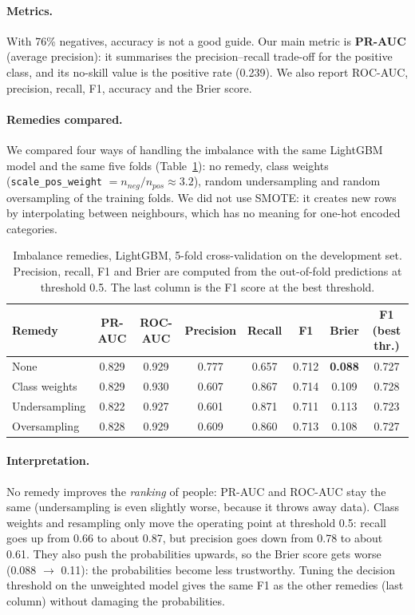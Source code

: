 \documentclass[11pt,a4paper]{article}
\begin{document}
\paragraph{Metrics.}
With 76\% negatives, accuracy is not a good guide. Our main metric is \textbf{PR-AUC} (average precision): it summarises the precision--recall trade-off for the positive class, and its no-skill value is the positive rate (0.239). We also report ROC-AUC, precision, recall, F1, accuracy and the Brier score.

\paragraph{Remedies compared.}
We compared four ways of handling the imbalance with the same LightGBM model and the same five folds (Table~\ref{tab:remedies}): no remedy, class weights (\texttt{scale\_pos\_weight} $= n_{neg}/n_{pos} \approx 3.2$), random undersampling and random oversampling of the training folds.
We did not use SMOTE: it creates new rows by interpolating between neighbours, which has no meaning for one-hot encoded categories.

\begin{table}[!htbp]
\centering
\small
\caption{Imbalance remedies, LightGBM, 5-fold cross-validation on the development set. Precision, recall, F1 and Brier are computed from the out-of-fold predictions at threshold 0.5. The last column is the F1 score at the best threshold.}
\label{tab:remedies}
\begin{tabular}{lccccccc}
\toprule
\textbf{Remedy} & \textbf{PR-AUC} & \textbf{ROC-AUC} & \textbf{Precision} & \textbf{Recall} & \textbf{F1} & \textbf{Brier} & \textbf{F1 (best thr.)} \\
\midrule
None & 0.829 & 0.929 & 0.777 & 0.657 & 0.712 & \textbf{0.088} & 0.727 \\
Class weights & 0.829 & 0.930 & 0.607 & 0.867 & 0.714 & 0.109 & 0.728 \\
Undersampling & 0.822 & 0.927 & 0.601 & 0.871 & 0.711 & 0.113 & 0.723 \\
Oversampling & 0.828 & 0.929 & 0.609 & 0.860 & 0.713 & 0.108 & 0.727 \\
\bottomrule
\end{tabular}
\end{table}

\paragraph{Interpretation.}
No remedy improves the \emph{ranking} of people: PR-AUC and ROC-AUC stay the same (undersampling is even slightly worse, because it throws away data).
Class weights and resampling only move the operating point at threshold 0.5: recall goes up from 0.66 to about 0.87, but precision goes down from 0.78 to about 0.61.
They also push the probabilities upwards, so the Brier score gets worse (0.088 $\rightarrow$ 0.11): the probabilities become less trustworthy.
Tuning the decision threshold on the unweighted model gives the same F1 as the other remedies (last column) without damaging the probabilities.
\end{document}
